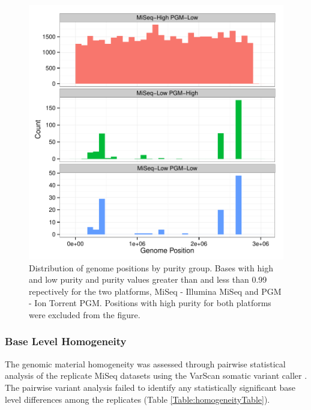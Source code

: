 \documentclass[smallextended]{svjour3}\usepackage[]{graphicx}\usepackage[]{color}
\makeatletter
\def\maxwidth{ %
  \ifdim\Gin@nat@width>\linewidth
    \linewidth
  \else
    \Gin@nat@width
  \fi
}
\newenvironment{knitrout}{}{} %
\makeatother
\begin{document}
\begin{knitrout}
\color{fgcolor}\begin{figure}

{\centering \includegraphics[width=\maxwidth]{figure/purityPositionFig-1} 

}

\caption[Distribution of genome positions by purity group]{Distribution of genome positions by purity group. Bases with high and low purity and purity values greater than and less than 0.99 repectively for the two platforms, MiSeq - Illumina MiSeq and PGM - Ion Torrent PGM.  Positions with high purity for both platforms were excluded from the figure.}\label{fig:purityPositionFig}
\end{figure}


\end{knitrout}


\subsubsection{Base Level Homogeneity}
The genomic material homogeneity was assessed through pairwise statistical analysis of the replicate MiSeq datasets using the VarScan somatic variant caller \cite{Koboldt2009}.  The pairwise variant analysis failed to identify any statistically significant base level differences among the replicates (Table \ref{Table:homogeneityTable}).
\end{document}
